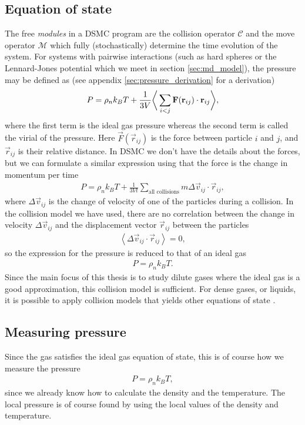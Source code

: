 \subsection{Equation of state}
\label{sec:dsmc_eos}
The free \textit{modules} in a DSMC program are the collision operator $\mathcal C$ and the move operator $\mathcal M$ which fully (stochastically) determine the time evolution of the system. For systems with pairwise interactions (such as hard spheres or the Lennard-Jones potential which we meet in section \ref{sec:md_model}), the pressure may be defined as (see appendix \ref{sec:pressure_derivation} for a derivation)
\begin{align}
	P = \rho_nk_BT + {1\over 3V}\bigg\langle \sum_{i<j} \vec F(\vec r_{ij})\cdot \vec r_{ij}\bigg\rangle,
\end{align}
where the first term is the ideal gas pressure whereas the second term is called the virial of the pressure. Here $\vec F(\vec r_{ij})$ is the force between particle $i$ and $j$, and $\vec r_{ij}$ is their relative distance. In DSMC we don't have the details about the forces, but we can formulate a similar expression using that the force is the change in momentum per time
\begin{align}
	P = \rho_nk_BT + \frac{1}{3Vt}\sum_\text{all collisions} m\Delta \vec v_{ij}\cdot \vec r_{ij},
\end{align}
where $\Delta \vec v_{ij}$ is the change of velocity of one of the particles during a collision\cite{garcia1997direct}. In the collision model we have used, there are no correlation between the change in velocity $\Delta \vec v_{ij}$ and the displacement vector $\vec r_{ij}$ between the particles
\begin{align}
	\left\langle \Delta \vec v_{ij}\cdot \vec r_{ij}\right\rangle = 0,
\end{align}
so the expression for the pressure is reduced to that of an ideal gas
\begin{align}
	P = \rho_n k_BT.
\end{align}
Since the main focus of this thesis is to study dilute gases where the ideal gas is a good approximation, this collision model is sufficient. For dense gases, or liquids, it is possible to apply collision models that yields other equations of state \cite{garcia1997direct}.
\subsection{Measuring pressure}
Since the gas satisfies the ideal gas equation of state, this is of course how we measure the pressure
\begin{align}
	P = \rho_n k_BT,
\end{align}
since we already know how to calculate the density and the temperature. The local pressure is of course found by using the local values of the density and temperature.
